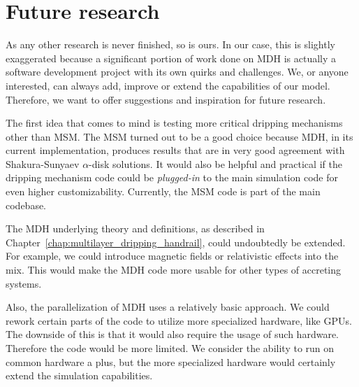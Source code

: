 \section{Future research}
    As any other research is never finished, so is ours. In our case, this is slightly exaggerated because a significant portion of work done on MDH is actually a software development project with its own quirks and challenges. We, or anyone interested, can always add, improve or extend the capabilities of our model. Therefore, we want to offer suggestions and inspiration for future research. 

    The first idea that comes to mind is testing more critical dripping mechanisms other than MSM. The MSM turned out to be a good choice because MDH, in its current implementation, produces results that are in very good agreement with Shakura-Sunyaev $\alpha$-disk solutions. It would also be helpful and practical if the dripping mechanism code could be \emph{plugged-in} to the main simulation code for even higher customizability. Currently, the MSM code is part of the main codebase. 

    The MDH underlying theory and definitions, as described in Chapter~\ref{chap:multilayer_dripping_handrail}, could undoubtedly be extended. For example, we could introduce magnetic fields or relativistic effects into the mix. This would make the MDH code more usable for other types of accreting systems.

    Also, the parallelization of MDH uses a relatively basic approach. We could rework certain parts of the code to utilize more specialized hardware, like GPUs. The downside of this is that it would also require the usage of such hardware. Therefore the code would be more limited. We consider the ability to run on common hardware a plus, but the more specialized hardware would certainly extend the simulation capabilities. 
